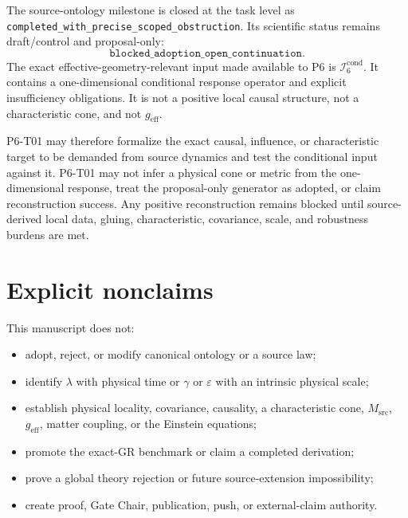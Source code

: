 \documentclass[11pt]{article}
\begin{document}
The source-ontology milestone is closed at the task level as
\texttt{completed\_with\_precise\_scoped\_obstruction}.  Its scientific
status remains draft/control and proposal-only:
\[
\texttt{blocked\_adoption\_open\_continuation}.
\]
The exact effective-geometry-relevant input made available to P6 is
\(\mathcal I^{\mathrm{cond}}_6\).  It contains a one-dimensional conditional
response operator and explicit insufficiency obligations.  It is not a
positive local causal structure, not a characteristic cone, and not
\(g_{\mathrm{eff}}\).

P6-T01 may therefore formalize the exact causal, influence, or characteristic
target to be demanded from source dynamics and test the conditional input
against it.  P6-T01 may not infer a physical cone or metric from the
one-dimensional response, treat the proposal-only generator as adopted, or
claim reconstruction success.  Any positive reconstruction remains blocked
until source-derived local data, gluing, characteristic, covariance, scale,
and robustness burdens are met.

\section{Explicit nonclaims}

This manuscript does not:
\begin{itemize}
  \item adopt, reject, or modify canonical ontology or a source law;
  \item identify \(\lambda\) with physical time or \(\gamma\) or
  \(\varepsilon\) with an intrinsic physical scale;
  \item establish physical locality, covariance, causality, a characteristic
  cone, \(M_{\mathrm{src}}\), \(g_{\mathrm{eff}}\), matter coupling, or the
  Einstein equations;
  \item promote the exact-GR benchmark or claim a completed derivation;
  \item prove a global theory rejection or future source-extension
  impossibility;
  \item create proof, Gate Chair, publication, push, or external-claim
  authority.
\end{itemize}
\end{document}
